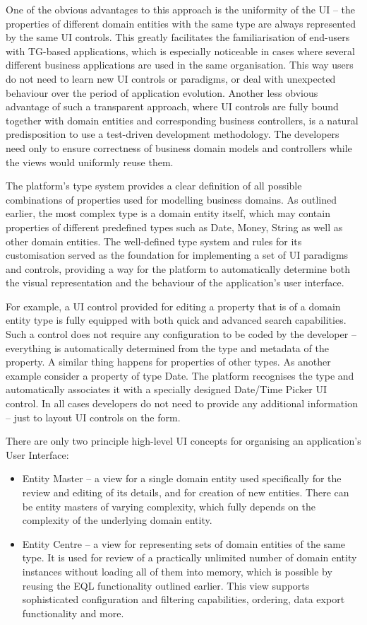  One of the obvious advantages to this approach is the uniformity of the UI -- the properties of different domain entities with the same type are always represented by the same UI controls.
  This greatly facilitates the familiarisation of end-users with TG-based applications, which is especially noticeable in cases where several different business applications are used in the same organisation.
  This way users do not need to learn new UI controls or paradigms, or deal with unexpected behaviour over the period of application evolution.
  Another less obvious advantage of such a transparent approach, where UI controls are fully bound together with domain entities and corresponding business controllers, is a natural predisposition to use a test-driven development methodology.
  The developers need only to ensure correctness of business domain models and controllers while the views would uniformly reuse them.

  The platform's type system provides a clear definition of all possible combinations of properties used for modelling business domains.
  As outlined earlier, the most complex type is a domain entity itself, which may contain properties of different predefined types such as Date, Money, String as well as other domain entities.
  The well-defined type system and rules for its customisation served as the foundation for implementing a set of UI paradigms and controls, providing a way for the platform to automatically determine both the visual representation and the behaviour of the application's user interface.
    
  For example, a UI control provided for editing a property that is of a domain entity type is fully equipped with both quick and advanced search capabilities.
  Such a control does not require any configuration to be coded by the developer -- everything is automatically determined from the type and metadata of the property.
  A similar thing happens for properties of other types.
  As another example consider a property of type Date.
  The platform recognises the type and automatically associates it with a specially designed Date/Time Picker UI control.
  In all cases developers do not need to provide any additional information -- just to layout UI controls on the form.
  
  There are only two principle high-level UI concepts for organising an application's User Interface:
  \begin{itemize}
   \item Entity Master -- a view for a single domain entity used specifically for the review and editing of its details, and for creation of new entities.
	 There can be entity masters of varying complexity, which fully depends on the complexity of the underlying domain entity.
    \item Entity Centre -- a view for representing sets of domain entities of the same type. 
	  It is used for review of a practically unlimited number of domain entity instances without loading all of them into memory, which is possible by reusing the EQL functionality outlined earlier.
	  This view supports sophisticated configuration and filtering capabilities, ordering, data export functionality and more.
  \end{itemize}
  
